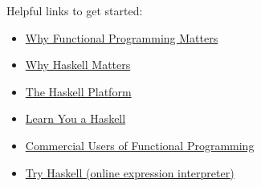 \begin{frame}
  Helpful links to get started:

  \begin{itemize}
    \item \href{http://www.cse.chalmers.se/~rjmh/Papers/whyfp.pdf}{Why Functional Programming Matters}
    \item \href{http://haskell.org/haskellwiki/Why_Haskell_matters}{Why Haskell Matters}
    \item \href{http://hackage.haskell.org/platform/}{The Haskell Platform}
    \item \href{http://learnyouahaskell.com/}{Learn You a Haskell}
    \item \href{http://cufp.org/}{Commercial Users of Functional Programming}
    \item \href{http://tryhaskell.org/}{Try Haskell (online expression interpreter)}
  \end{itemize}
\end{frame}
